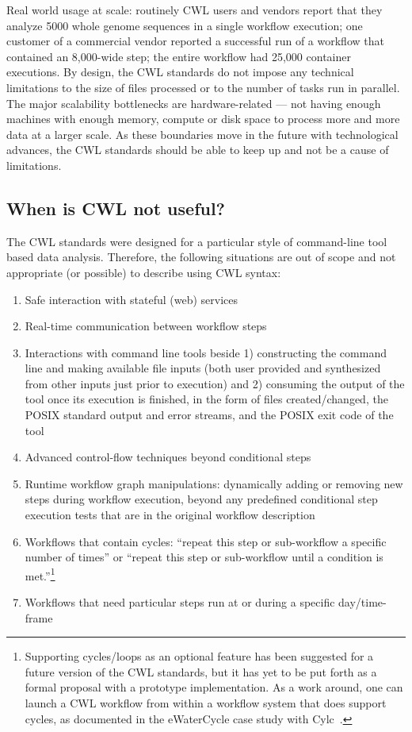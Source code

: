 {Real world usage at scale: routinely CWL users and vendors report that they analyze 5000 whole genome sequences in a single workflow execution; one customer of a commercial vendor reported a successful run of a workflow that contained an 8,000-wide step; the entire workflow had 25,000 container executions. By design, the CWL standards do not impose any technical limitations to the size of files processed or to the number of tasks run in parallel. The major scalability bottlenecks are hardware-related --- not having enough machines with enough memory, compute or disk space to process more and more data at a larger scale. As these boundaries move in the future with technological advances, the CWL standards should be able to keep up and not be a cause of limitations.

\subsection{When is CWL not useful?} \label{sec:limitations}
The CWL standards were designed for a particular style of command-line tool based data analysis. Therefore, the following situations are out of scope and not appropriate (or possible) to describe using CWL syntax:

\begin{enumerate}
\item Safe interaction with stateful (web) services
\item Real-time communication between workflow steps
\item Interactions with command line tools beside 1) constructing the command line and making available file inputs (both user provided and synthesized from other inputs just prior to execution) and 2) consuming the output of the tool once its execution is finished, in the form of files created/changed, the POSIX standard output and error streams, and the POSIX exit code of the tool
\item Advanced control-flow techniques beyond conditional steps
\item Runtime workflow graph manipulations: dynamically adding or removing new steps during workflow execution, beyond any predefined conditional step execution tests that are in the original workflow description
\item Workflows that contain cycles: ``repeat this step or sub-workflow a specific number of times'' or ``repeat this step or sub-workflow until a condition is met.''\footnote{Supporting cycles/loops as an optional feature has been suggested for a future version of the CWL standards, but it has yet to be put forth as a formal proposal with a prototype implementation. As a work around, one can launch a CWL workflow from within a workflow system that does support cycles, as documented in the eWaterCycle case study with Cylc~\cite{oliver_workflow_2019}.}
\item Workflows that need particular steps run at or during a specific day/time-frame
\end{enumerate}

}
